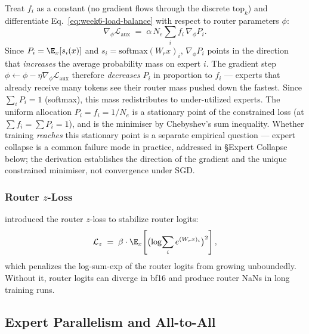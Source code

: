 \begin{derivation}
Treat $f_i$ as a constant (no gradient flows through the discrete
$\mathrm{top}_k$) and differentiate
Eq.~\eqref{eq:week6-load-balance} with respect to router parameters
$\phi$:
\[
\nabla_\phi \mathcal{L}_{\mathrm{aux}}
  \;=\; \alpha\,N_e \sum_{i} f_i \,\nabla_\phi P_i.
\]
Since $P_i = \E_x[s_i(x)]$ and $s_i = \mathrm{softmax}(W_r x)_i$,
$\nabla_\phi P_i$ points in the direction that \emph{increases} the
average probability mass on expert $i$. The gradient step
$\phi \gets \phi - \eta \nabla_\phi \mathcal{L}_{\mathrm{aux}}$
therefore \emph{decreases} $P_i$ in proportion to $f_i$ --- experts
that already receive many tokens see their router mass pushed down
the fastest. Since $\sum_i P_i = 1$ (softmax), this mass
redistributes to under-utilized experts. The uniform allocation
$P_i = f_i = 1/N_e$ is a stationary point of the constrained loss
(at $\sum f_i = \sum P_i = 1$), and is the minimiser by Chebyshev's
sum inequality. Whether training \emph{reaches} this stationary
point is a separate empirical question --- expert collapse is a
common failure mode in practice, addressed in
\S Expert Collapse below; the derivation establishes the direction
of the gradient and the unique constrained minimiser, not
convergence under SGD.
\end{derivation}

\subsubsection{\texorpdfstring{Router $z$-Loss}{Router z-Loss}}

\citet{zoph2022stmoe} introduced the router $z$-loss to stabilize
router logits:
\begin{equation}
\label{eq:week6-zloss}
\mathcal{L}_z \;=\;
  \beta \cdot \E_x\!\left[\bigl(\log\!\sum_i e^{(W_r x)_i}\bigr)^2\right],
\end{equation}
which penalizes the log-sum-exp of the router logits from growing
unboundedly. Without it, router logits can diverge in bf16 and
produce router NaNs in long training runs.

\subsection{Expert Parallelism and All-to-All}

